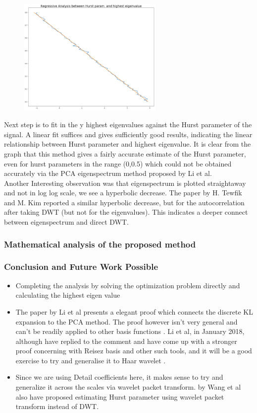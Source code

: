 \documentclass[a4paper]{article}
\begin{document}
\begin{figure}
\vspace{-15pt}
\includegraphics[width=7cm]{dwt_lin.png}
\vspace{-30pt}
\end{figure} 
Next step is to fit in the y highest eigenvalues against the Hurst parameter of the signal. A linear fit suffices and gives sufficiently good results, indicating the linear relationship between Hurst parameter and highest eigenvalue.  It is clear from the graph that this method gives a fairly accurate estimate of the Hurst parameter, even for hurst parameters in the range (0,0.5) which could not be obtained accurately via the PCA eigenspectrum method proposed by Li et al.
\\
Another Interesting observation was that eigenspectrum is plotted straightaway and not in log log scale, we see a hyperbolic decrease. The paper by H. Tewfik and M. Kim\cite{Eigen} reported a similar hyperbolic decrease, but for the autocorrelation after taking DWT (but not for the eigenvalues). This indicates a deeper connect between eigenspectrum and direct DWT.

\subsubsection{Mathematical analysis of the proposed method}
\subsubsection{Conclusion and Future Work Possible}
\begin{itemize}
	\item Completing the analysis by solving the optimization problem directly and calculating the highest eigen value
	\item The paper by Li et al \cite{DBLP:journals/tsp/LiHCZ09} presents a elegant proof which connects the discrete KL expansion to the PCA method. The proof however isn't very general and can't be readily applied to other basis functions \cite{5447734}. Li et al, in January 2018, although have replied to the comment and have come up with a stronger proof concerning with Reisez basis and other such tools, and it will be a good exercise to try and generalise it to Haar wavelet \cite{response}.
	\item Since we are using Detail coefficients here, it makes sense to try and generalize it across the scales via wavelet packet transform. \cite{4127049} by Wang et al also have proposed estimating Hurst parameter using wavelet packet transform instead of DWT. 
\end{itemize}
\end{document}
